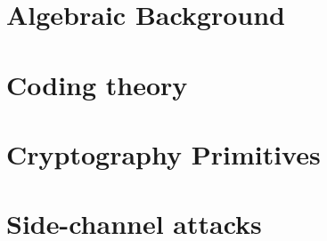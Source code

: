 \section{Algebraic Background}
\section{Coding theory}
\section{Cryptography Primitives}
\section{Side-channel attacks}